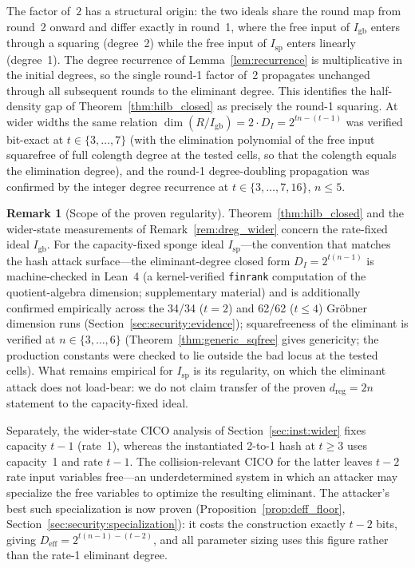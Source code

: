 \documentclass[11pt,a4paper]{article}
\theoremstyle{definition}
\newtheorem{remark}[theorem]{Remark}
\begin{document}
The factor of~$2$ has a structural origin: the two ideals share the
round map from round~2 onward and differ exactly in round~1, where
the free input of $I_{\mathrm{gb}}$ enters through a squaring
(degree~2) while the free input of $I_{\mathrm{sp}}$ enters linearly
(degree~1). The degree recurrence of Lemma~\ref{lem:recurrence} is
multiplicative in the initial degrees, so the single round-1 factor
of~2 propagates unchanged through all subsequent rounds to the
eliminant degree. This identifies the half-density gap of
Theorem~\ref{thm:hilb_closed} as precisely the round-1 squaring. At
wider widths the same relation
$\dim(R/I_{\mathrm{gb}}) = 2 \cdot D_I = 2^{tn-(t-1)}$ was verified
bit-exact at $t \in \{3, \ldots, 7\}$ (with the elimination
polynomial of the free input squarefree of full colength degree at
the tested cells, so that the colength equals the elimination
degree), and the round-1 degree-doubling propagation was confirmed by
the integer degree recurrence at $t \in \{3, \ldots, 7, 16\}$,
$n \le 5$.

\begin{remark}[Scope of the proven regularity]\label{rem:convention_scope}
Theorem~\ref{thm:hilb_closed} and the wider-state measurements of
Remark~\ref{rem:dreg_wider} concern the rate-fixed ideal
$I_{\mathrm{gb}}$. For the capacity-fixed sponge ideal
$I_{\mathrm{sp}}$---the convention that matches the hash attack
surface---the eliminant-degree closed form $D_I = 2^{t(n-1)}$ is
machine-checked in Lean~4 (a kernel-verified \texttt{finrank}
computation of the quotient-algebra dimension; supplementary
material) and is additionally confirmed empirically across
the 34/34 ($t=2$) and 62/62 ($t \le 4$) Gr\"obner dimension runs
(Section~\ref{sec:security:evidence}); squarefreeness of the
eliminant is verified at $n \in \{3, \ldots, 6\}$
(Theorem~\ref{thm:generic_sqfree} gives genericity; the production
constants were checked to lie outside the bad locus at the tested
cells). What remains empirical for $I_{\mathrm{sp}}$ is its
regularity, on which the eliminant attack does not load-bear: we do
not claim transfer of the proven $d_{\mathrm{reg}} =
2n$ statement to the capacity-fixed ideal.

Separately, the wider-state CICO analysis of
Section~\ref{sec:inst:wider} fixes capacity $t-1$ (rate~1), whereas
the instantiated 2-to-1 hash at $t \ge 3$ uses capacity~1 and rate
$t-1$. The collision-relevant CICO for the latter leaves $t-2$ rate
input variables free---an underdetermined system in which an attacker
may specialize the free variables to optimize the resulting
eliminant. The attacker's best such specialization is now proven
(Proposition~\ref{prop:deff_floor},
Section~\ref{sec:security:specialization}): it costs the
construction exactly $t-2$ bits, giving
$D_{\mathrm{eff}} = 2^{t(n-1)-(t-2)}$, and all parameter sizing uses
this figure rather than the rate-1 eliminant degree.
\end{remark}
\end{document}
